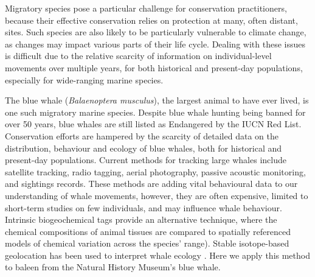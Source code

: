 \documentclass[a4paper,12pt]{article}
\begin{document}
Migratory species pose a particular challenge for conservation practitioners, because their effective conservation relies on protection at many, often distant, sites\cite{runge2014conserving}. 
Such species are also likely to be particularly vulnerable to climate change, as changes may impact various parts of their life cycle\cite{robinson2009travelling}. 
Dealing with these issues is difficult due to the relative scarcity of information on individual-level movements over multiple years, for both historical and present-day populations, especially for wide-ranging marine species\cite{ryan2013stable,hall2005stable,bailey2009behavioural}. 
 
The blue whale (\textit{Balaenoptera musculus}), the largest animal to have ever lived, is one such migratory marine species. 
Despite blue whale hunting being banned for over 50 years, blue whales are still listed as Endangered by the IUCN Red List\cite{reilly2008balaenoptera}.
Conservation efforts are hampered by the scarcity of detailed data on the distribution, behaviour and ecology of blue whales, both for historical and present-day populations. 
Current methods for tracking large whales include satellite tracking, radio tagging, aerial photography, passive acoustic monitoring, and sightings records\cite{borger15,mcdonald2006biogeographic,bailey2009behavioural,mate2007evolution,silva2013north}. 
These methods are adding vital behavioural data to our understanding of whale movements, however, they are often expensive, limited to short-term studies on few individuals\cite{bailey2009behavioural,best2015tag,mate2007evolution}, and may influence whale behaviour\cite{walker2012review}. 
Intrinsic biogeochemical tags provide an alternative technique, where the chemical compositions of animal tissues are compared to spatially referenced models of chemical variation across the species' range\cite{hobson1999tracing,hobson2008tracking}). 
Stable isotope-based geolocation has been used to interpret whale ecology \cite{hobson1998stable,ryan2013stable,eisenmann2016isotopic}. 
Here we apply this method to baleen from the Natural History Museum's blue whale.
 
\end{document}
